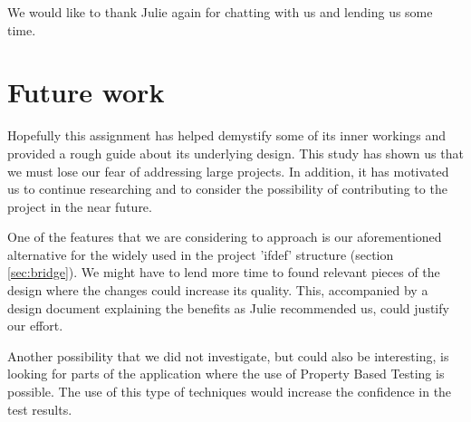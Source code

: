 We would like to thank Julie again for chatting with us and lending us some time.


\section{Future work}

Hopefully this assignment has helped demystify some of its inner workings and provided a rough guide about its underlying design. This study has shown us that we must lose our fear of addressing large projects. In addition, it has motivated us to continue researching and to consider the possibility of contributing to the project in the near future. 

One of the features that we are considering to approach is our aforementioned alternative for the widely used in the project 'ifdef' structure (section \ref{sec:bridge}). We might have to lend more time to found relevant pieces of the design where the changes could increase its quality. This, accompanied by a design document explaining the benefits as Julie recommended us, could justify our effort.

Another possibility that we did not investigate, but could also be interesting, is looking for parts of the application where the use of Property Based Testing is possible. The use of this type of techniques would increase the confidence in the test results.